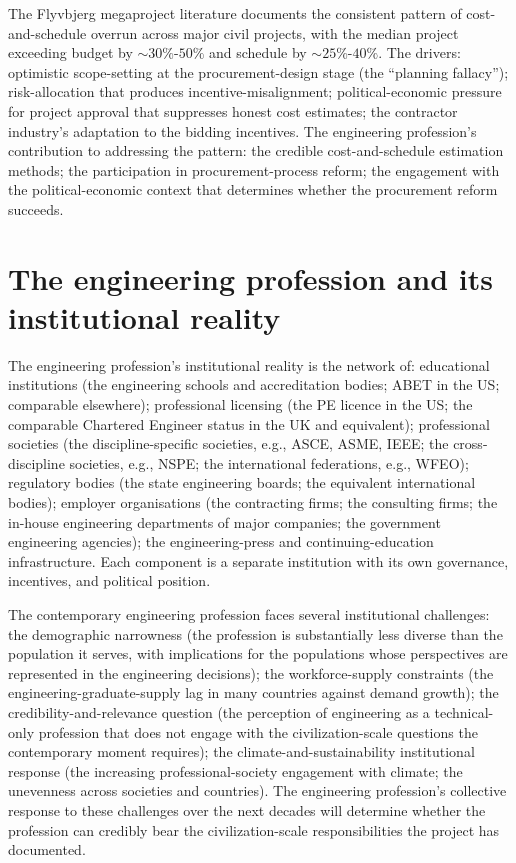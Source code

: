 The Flyvbjerg megaproject literature \cite{paper:flyvbjerg-megaprojects-2014} documents the consistent pattern of cost-and-schedule overrun across major civil projects, with the median project exceeding budget by $\sim 30\%$-$50\%$ and schedule by $\sim 25\%$-$40\%$. The drivers: optimistic scope-setting at the procurement-design stage (the ``planning fallacy''); risk-allocation that produces incentive-misalignment; political-economic pressure for project approval that suppresses honest cost estimates; the contractor industry's adaptation to the bidding incentives. The engineering profession's contribution to addressing the pattern: the credible cost-and-schedule estimation methods; the participation in procurement-process reform; the engagement with the political-economic context that determines whether the procurement reform succeeds.

\section{The engineering profession and its institutional reality}

The engineering profession's institutional reality is the network of: educational institutions (the engineering schools and accreditation bodies; ABET in the US; comparable elsewhere); professional licensing (the PE licence in the US; the comparable Chartered Engineer status in the UK and equivalent); professional societies (the discipline-specific societies, e.g., ASCE, ASME, IEEE; the cross-discipline societies, e.g., NSPE; the international federations, e.g., WFEO); regulatory bodies (the state engineering boards; the equivalent international bodies); employer organisations (the contracting firms; the consulting firms; the in-house engineering departments of major companies; the government engineering agencies); the engineering-press and continuing-education infrastructure. Each component is a separate institution with its own governance, incentives, and political position.

The contemporary engineering profession faces several institutional challenges: the demographic narrowness (the profession is substantially less diverse than the population it serves, with implications for the populations whose perspectives are represented in the engineering decisions); the workforce-supply constraints (the engineering-graduate-supply lag in many countries against demand growth); the credibility-and-relevance question (the perception of engineering as a technical-only profession that does not engage with the civilization-scale questions the contemporary moment requires); the climate-and-sustainability institutional response (the increasing professional-society engagement with climate; the unevenness across societies and countries). The engineering profession's collective response to these challenges over the next decades will determine whether the profession can credibly bear the civilization-scale responsibilities the project has documented.

